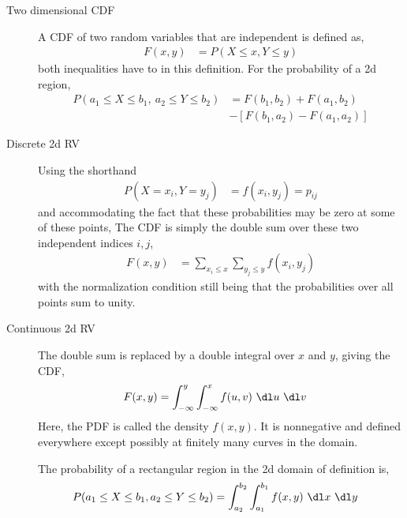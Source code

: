 \begin{description}
    \item[Two dimensional CDF] A CDF of two random variables that are independent is
          defined as,
          \begin{align}
              F(x, y) & = P(X \leq x, Y \leq y)
          \end{align}
          both inequalities have to in this definition. For the probability of a 2d
          region,
          \begin{align}
              P(a_1 \leq X \leq b_1,\ a_2 \leq Y \leq b_2)
               & = F(b_1, b_2) + F(a_1,b_2)  \\
               & - [F(b_1,a_2) - F(a_1,a_2)]
          \end{align}

    \item[Discrete 2d RV] Using the shorthand
          \begin{align}
              P(X = x_i, Y = y_j) & = f(x_i, y_j) = p_{ij}
          \end{align}
          and accommodating the fact that these probabilities may be zero at some of
          these points,
          The CDF is simply the double sum over these two independent indices $ i,j $,
          \begin{align}
              F(x, y) & = \sum_{x_i \leq x} \sum_{y_j \leq y} f(x_i, y_j)
          \end{align}
          with the normalization condition still being that the probabilities over all
          points sum to unity.

    \item[Continuous 2d RV] The double sum is replaced by a double integral over $ x $
          and $ y $, giving the CDF,
          \begin{align}
              F(x, y) & = \int_{-\infty}^{y} \int_{-\infty}^{x}
              f(u, v)\ \dl u\ \dl v
          \end{align}
          Here, the PDF is called the density $ f(x, y) $. It is nonnegative and
          defined everywhere except possibly at finitely many curves in the domain.
          \par
          The probability of a rectangular region in the 2d domain of definition is,
          \begin{align}
              P(a_1 \leq X \leq b_1, a_2 \leq Y \leq b_2)
               & = \int_{a_2}^{b_2} \int_{a_1}^{b_1} f(x, y)\ \dl x\ \dl y
          \end{align}


\end{description}
